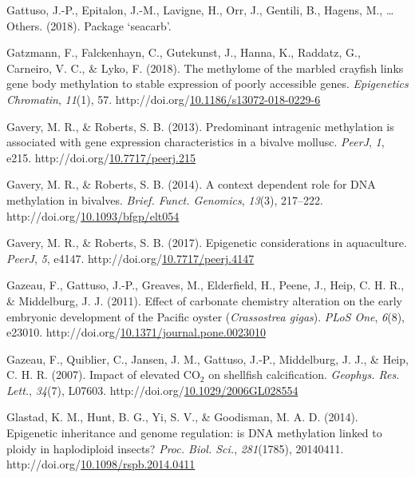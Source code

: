 \documentclass [11pt, proquest] {uwthesis}[2015/03/03]
\newlength{\cslhangindent}
\newenvironment{CSLReferences}%
{\setlength{\parindent}{0pt}%
\everypar{\setlength{\hangindent}{\cslhangindent}}\ignorespaces}%
{\par}
\begin{document}
\begin{CSLReferences}{1}{0}
\leavevmode\hypertarget{ref-Gattuso2018}{}%
Gattuso, J.-P., Epitalon, J.-M., Lavigne, H., Orr, J., Gentili, B., Hagens, M., \ldots{} Others. (2018). {Package {`seacarb'}}.

\leavevmode\hypertarget{ref-Gatzmann2018}{}%
Gatzmann, F., Falckenhayn, C., Gutekunst, J., Hanna, K., Raddatz, G., Carneiro, V. C., \& Lyko, F. (2018). {The methylome of the marbled crayfish links gene body methylation to stable expression of poorly accessible genes}. \emph{Epigenetics Chromatin}, \emph{11}(1), 57. http://doi.org/\href{https://doi.org/10.1186/s13072-018-0229-6}{10.1186/s13072-018-0229-6}

\leavevmode\hypertarget{ref-Gavery2013}{}%
Gavery, M. R., \& Roberts, S. B. (2013). {Predominant intragenic methylation is associated with gene expression characteristics in a bivalve mollusc}. \emph{PeerJ}, \emph{1}, e215. http://doi.org/\href{https://doi.org/10.7717/peerj.215}{10.7717/peerj.215}

\leavevmode\hypertarget{ref-Gavery2014}{}%
Gavery, M. R., \& Roberts, S. B. (2014). {A context dependent role for DNA methylation in bivalves}. \emph{Brief. Funct. Genomics}, \emph{13}(3), 217--222. http://doi.org/\href{https://doi.org/10.1093/bfgp/elt054}{10.1093/bfgp/elt054}

\leavevmode\hypertarget{ref-Gavery2017}{}%
Gavery, M. R., \& Roberts, S. B. (2017). {Epigenetic considerations in aquaculture}. \emph{PeerJ}, \emph{5}, e4147. http://doi.org/\href{https://doi.org/10.7717/peerj.4147}{10.7717/peerj.4147}

\leavevmode\hypertarget{ref-Gazeau2011}{}%
Gazeau, F., Gattuso, J.-P., Greaves, M., Elderfield, H., Peene, J., Heip, C. H. R., \& Middelburg, J. J. (2011). {Effect of carbonate chemistry alteration on the early embryonic development of the Pacific oyster (\emph{Crassostrea gigas})}. \emph{PLoS One}, \emph{6}(8), e23010. http://doi.org/\href{https://doi.org/10.1371/journal.pone.0023010}{10.1371/journal.pone.0023010}

\leavevmode\hypertarget{ref-Gazeau2007}{}%
Gazeau, F., Quiblier, C., Jansen, J. M., Gattuso, J.-P., Middelburg, J. J., \& Heip, C. H. R. (2007). {Impact of elevated {CO\(_2\)} on shellfish calcification}. \emph{Geophys. Res. Lett.}, \emph{34}(7), L07603. http://doi.org/\href{https://doi.org/10.1029/2006GL028554}{10.1029/2006GL028554}

\leavevmode\hypertarget{ref-Glastad2014}{}%
Glastad, K. M., Hunt, B. G., Yi, S. V., \& Goodisman, M. A. D. (2014). {Epigenetic inheritance and genome regulation: is DNA methylation linked to ploidy in haplodiploid insects?} \emph{Proc. Biol. Sci.}, \emph{281}(1785), 20140411. http://doi.org/\href{https://doi.org/10.1098/rspb.2014.0411}{10.1098/rspb.2014.0411}


\end{CSLReferences}
\end{document}
